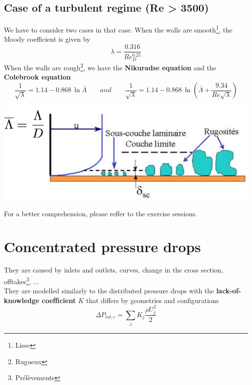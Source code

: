 	\subsection{Case of a turbulent regime (Re > 3500)}
		We have to consider two cases in that case. When the walls are smooth\footnote{Lisse}, the Moody coefficient is given by 
		\begin{equation}
			\lambda = \frac{0.316}{Re_D^{0.25}}
		\end{equation}
		When the walls are rough\footnote{Rugueux}, we have the \textbf{Nikuradse equation} and the \textbf{Colebrook equation}
		\begin{equation}
			\frac{1}{\sqrt{\lambda}} = 1.14 - 0.868 \, \ln \bar{\Lambda}
			\qquad and \qquad
			\frac{1}{\sqrt{\lambda}} = 1.14 - 0.868 \, \ln \left(\bar{\Lambda}+\frac{9.34}{Re\sqrt{\lambda}} \right)
		\end{equation}
\begin{center}
		\includegraphics[scale=0.4]{ch2/7}
\end{center}
For a better comprehension, please reffer to the exercise sessions. 

\section{Concentrated pressure drops}
	They are caused by inlets and outlets, curves, change in the cross section, offtakes\footnote{Prélèvements}, ... \\
	They are modelled similarly to the distributed pressure drops with the \textbf{lack-of-knowledge coefficient} $K$ that differs by geometries and configurations
	\begin{equation}
		\Delta P_{tot,c} = \sum _j K_j \frac{\rho U_j^2}{2}
	\end{equation}
	
